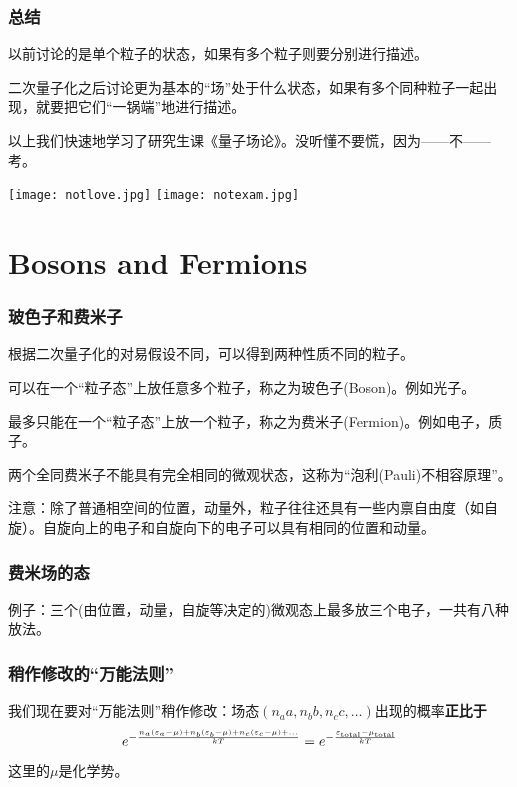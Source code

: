 \documentclass[CJK,14pt]{beamer}
\begin{document}
\begin{frame}
\frametitle{总结}
\bitem
\item{以前讨论的是单个粒子的状态，如果有多个粒子则要分别进行描述。}
\item{二次量子化之后讨论更为基本的“场”处于什么状态，如果有多个同种粒子一起出现，就要把它们“一锅端”地进行描述。}
\eitem
\end{frame}



\begin{frame}
以上我们快速地学习了研究生课《量子场论》。没听懂不要慌，因为——不——考。

\skiplines
\bcenter
\texttt{[image: notlove.jpg]} \hspace{0.25in} \texttt{[image: notexam.jpg]}
\ecenter
\end{frame}


\section{Bosons and Fermions}

\begin{frame}
\frametitle{玻色子和费米子}


根据二次量子化的对易假设不同，可以得到两种性质不同的粒子。

\bitem
\item{可以在一个“粒子态”上放任意多个粒子，称之为{\blue 玻色子(Boson)}。例如光子。}
\item{最多只能在一个“粒子态”上放一个粒子，称之为{\blue 费米子(Fermion)}。例如电子，质子。}
\eitem

{\blue 两个全同费米子不能具有完全相同的微观状态}，这称为“{\blue 泡利(Pauli)不相容原理}”。

{\small 注意：除了普通相空间的位置，动量外，粒子往往还具有一些内禀自由度（如自旋）。自旋向上的电子和自旋向下的电子可以具有相同的位置和动量。}

\end{frame}


\begin{frame}
\frametitle{费米场的态}

例子：三个(由位置，动量，自旋等决定的)微观态上最多放三个电子，一共有八种放法。
\emini
{}
\emini
\end{frame}



\begin{frame}
\frametitle{稍作修改的“万能法则”}

我们现在要对“万能法则”稍作修改：场态$(n_a a, n_bb, n_c c,\ldots)$出现的概率{\bf 正比于}
$$e^{-\frac{n_a(\varepsilon_a-\mu)+n_b(\varepsilon_b-\mu)+n_c(\varepsilon_c-\mu)+\ldots}{kT}} = e^{-\frac{\varepsilon_{\rm total} - \mu_{\rm total}}{kT}}$$

这里的$\mu$是化学势。
\end{frame}
\end{document}
